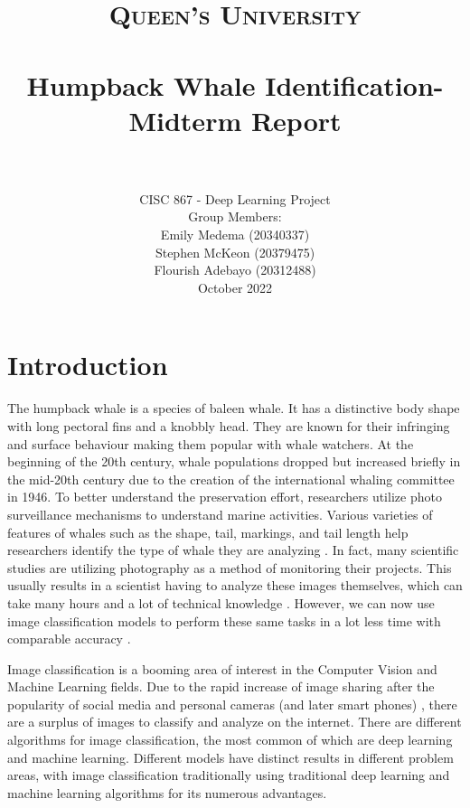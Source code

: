 \documentclass[paper=a4, fontsize=11pt]{scrartcl}
\title{
		\usefont{OT1}{bch}{b}{n}
		\normalfont \normalsize \textsc{Queen's University} \\ [25pt]
		\horrule{0.5pt} \\[0.4cm]
		\huge Humpback Whale Identification- Midterm Report \\
		\horrule{2pt} \\[0.5cm]
}
\author{
    \normalfont 
      CISC 867 - Deep Learning Project \\
    \normalfont
    Group Members: \\ 
    \normalsize
    Emily Medema (20340337) \\ 
    \normalsize
    Stephen McKeon (20379475) \\ 
    \normalsize
    Flourish Adebayo (20312488) \\
    October 2022 \\ [3pt]}
\date{\vspace{-5ex}}
\numberwithin{equation}{section}		%
\numberwithin{table}{section}				%
\begin{document}
\maketitle



\newpage 

\section*{Introduction}\label{sec: intro}
The humpback whale is a species of baleen whale. It has a distinctive body shape with long pectoral fins and a knobbly head. They are known for their infringing and surface behaviour making them popular with whale watchers\cite{kareiva2006whales}. At the beginning of the 20th century, whale populations dropped but increased briefly in the mid-20th century due to the creation of the international whaling committee in 1946\cite{henderson2022behavior}. To better understand the preservation effort, researchers utilize photo surveillance mechanisms to understand marine activities. Various varieties of features of whales such as the shape, tail, markings, and tail length help researchers identify the type of whale they are analyzing \cite{JaisakthiS.M.2017Awms}. In fact, many scientific studies are utilizing photography as a method of monitoring their projects. This usually results in a scientist having to analyze these images themselves, which can take many hours and a lot of technical knowledge \cite{JaisakthiS.M.2017Awms}. However, we can now use image classification models to perform these same tasks in a lot less time with comparable accuracy \cite{JaisakthiS.M.2017Awms}.

Image classification is a booming area of interest in the Computer Vision and Machine Learning fields. Due to the rapid increase of image sharing after the popularity of social media and personal cameras (and later smart phones) \cite{jain2000statistical}, there are a surplus of images to classify and analyze on the internet. There are different algorithms for image classification, the most common of which are deep learning and machine learning. Different models have distinct results in different problem areas, with image classification traditionally using traditional deep learning and machine learning algorithms for its numerous advantages. 
\end{document}
